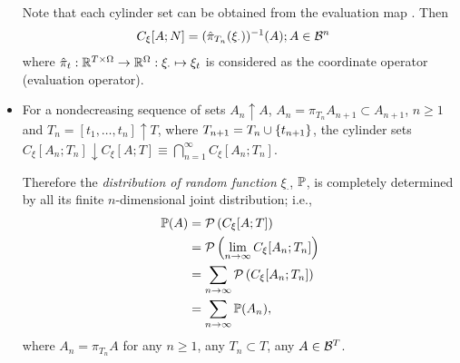 \documentclass[11pt]{article}
\begin{document}
\begin{itemize}
Note that each cylinder set can be obtained from the evaluation map . Then 
\begin{align*}
C_{\xi}[A; N] &= (\hat{\pi}_{T_{n}}(\xi_{\cdot}))^{-1}(A); A\in {\mathcal B}^{n}
\end{align*}
where $\hat{\pi}_{t}: {\mathbb R}^{T\times \Omega}\rightarrow {\mathbb R}^{\Omega}: \xi_{\cdot} \mapsto \xi_{t}$ is considered as the coordinate operator (evaluation operator).

\item For a nondecreasing sequence of sets $A_{n}\uparrow A$, $A_{n}=  \pi_{T_{n}}A_{n+1} \subset A_{n+1}$, $n\ge 1$ and $T_{n} = [t_{1}, \ldots, t_{n}] \uparrow T$, where $T_{n+1} = T_{n}\cup\left\{t_{n+1}\right\}$, the cylinder sets $C_{\xi}[A_{n};T_{n}] \downarrow  C_{\xi}[A; T] \equiv \bigcap_{n=1}^{\infty}C_{\xi}[A_{n};T_{n}]$. 

Therefore the \emph{distribution of random function} $\xi_{\cdot}$, ${\mathbb P}$, is completely determined by all its finite $n$-dimensional joint distribution; i.e., 
\begin{align*}
{\mathbb P}(A) &= {\mathcal P}\left(C_{\xi}[A; T]\right)\\
&={\mathcal P}\left(\lim\limits_{n\rightarrow \infty}C_{\xi}[A_{n}; T_{n}] \right)\\
&=\sum_{n\rightarrow \infty}{\mathcal P}\left(C_{\xi}[A_{n}; T_{n}] \right)\\
&= \sum_{n\rightarrow \infty}{\mathbb P}(A_{n}),
\end{align*}
where $A_{n}=  \pi_{T_{n}}A$ for any $n\ge 1$, any $T_{n}\subset T$, any $A\in {\mathcal B}^{T}$.
\end{itemize}
\end{document}
